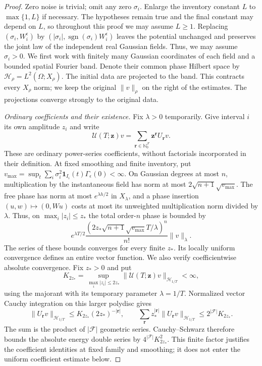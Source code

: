 \documentclass[12pt]{article}
\numberwithin{equation}{section}
\theoremstyle{definition}
\newcommand{\N}{\mathbb{N}}
\begin{document}
\begin{proof}
  Zero noise is trivial; omit any zero $\sigma_i$.
  Enlarge the inventory constant $L$ to $\max\{1,L\}$ if necessary.
  The hypotheses remain true and the final constant may depend on $L$,
  so throughout this proof we may assume $L\ge1$.
  Replacing $(\sigma_i,W_i^\epsilon)$ by
  $(|\sigma_i|,\operatorname{sgn}(\sigma_i)W_i^\epsilon)$ leaves the
  potential unchanged and preserves the joint law of the independent
  real Gaussian fields. Thus, we may assume $\sigma_i>0$.
  We first work with finitely many Gaussian coordinates of each field and
  a bounded spatial Fourier band. Denote their common phase Hilbert space
  by $\mathcal H_\rho=L^2(\Omega;X_\rho)$.
  The initial data are projected to the band. This contracts every
  $X_\rho$ norm; we keep the original $\|v\|_\rho$ on the right of
  the estimates. The projections converge strongly to the original data.

  \emph{Ordinary coefficients and their existence.}
  Fix $\lambda>0$ temporarily. Give interval $i$ its own amplitude
  $z_i$ and write
  \[
    \mathcal U(T;\boldsymbol z)v
    =\sum_{\boldsymbol r\in\N_0^{\mathcal F}}
    \boldsymbol z^{\boldsymbol r}U_{\boldsymbol r}v.
  \]
  These are ordinary power-series coefficients, without factorials
  incorporated in their definition. At fixed smoothing and finite inventory,
  put $v_{\max}=\sup_t\sum_i\sigma_i^2\mathbf1_{I_i}(t)
  \Gamma_\epsilon(0)<\infty$.
  On Gaussian degrees at most $n$, multiplication by the instantaneous
  field has norm at most $2\sqrt{n+1}\sqrt{v_{\max}}$.
  The free phase has norm at most $e^{\lambda h/2}$ in $X_\lambda$,
  and a phase insertion $(u,w)\mapsto(0,Wu)$ costs at most its
  unweighted multiplication norm divided by $\lambda$.
  Thus, on $\max_i|z_i|\le z_*$ the total order-$n$ phase is bounded by
  \begin{equation}\label{E:interval-entire-majorant}
    e^{\lambda T/2}
    \frac{(2z_*\sqrt{n+1}\sqrt{v_{\max}}T/\lambda)^n}{n!}
    \|v\|_\lambda .
  \end{equation}
  The series of these bounds converges for every finite $z_*$.
  Its locally uniform convergence defines an entire vector function.
  We also verify coefficientwise absolute convergence. Fix $z_*>0$ and put
  \[
    K_{2z_*}=\sup_{\max_i|z_i|\le2z_*}
    \|\mathcal U(T;\boldsymbol z)v\|_{\mathcal H_{1/T}}<\infty,
  \]
  using the majorant with its temporary parameter $\lambda=1/T$.
  Normalized vector Cauchy integration on this larger polydisc gives
  \[
    \|U_{\boldsymbol r}v\|_{\mathcal H_{1/T}}
    \le K_{2z_*}(2z_*)^{-|\boldsymbol r|},\qquad
    \sum_{\boldsymbol r}z_*^{|\boldsymbol r|}
    \|U_{\boldsymbol r}v\|_{\mathcal H_{1/T}}
    \le2^{|\mathcal F|}K_{2z_*}.
  \]
  The sum is the product of $|\mathcal F|$ geometric series.
  Cauchy--Schwarz therefore bounds the absolute energy double series
  by $4^{|\mathcal F|}K_{2z_*}^2$. This finite factor justifies the
  coefficient identities at fixed family and smoothing; it does not
  enter the uniform coefficient estimate below.


\end{proof}
\end{document}

